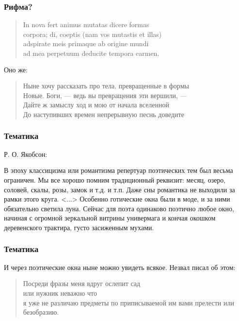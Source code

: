 \documentclass{beamer}
\begin{document}

\begin{frame}
\frametitle{Рифма?}

\begin{verse}
In nova fert animus mutatas dicere formas\\
corpora; di, coeptis (nam vos mutastis et illas)\\
adspirate meis primaque ab origine mundi\\
ad mea perpetuum deducite tempora carmen.
\end{verse}

\begin{center}
Оно же:
\end{center}

\begin{verse}
Ныне хочу рассказать про тела, превращенные в формы\\
Новые. Боги, — ведь  вы превращения эти вершили, —\\
Дайте ж замыслу ход и мою от начала вселенной\\
До наступивших времен непрерывную песнь доведите
\end{verse}

\end{frame}


\begin{frame}
\frametitle{Тематика}

Р. О. Якобсон:

В эпоху классицизма или романтизма репертуар поэтических тем был весьма ограничен. Мы все хорошо помним традиционный реквизит: месяц, озеро, соловей, скалы, розы, замок и т.д. и т.п. Даже сны романтика не выходили за рамки этого круга. <...>  Особенно готические окна были в моде, и за ними обязательно светила луна. Сейчас для поэта одинаково поэтично любое окно, начиная с огромной зеркальной витрины универмага и кончая окошком деревенского трактира, густо засиженным мухами. 

\end{frame}


\begin{frame}
\frametitle{Тематика}

И через поэтические окна ныне можно увидеть всякое. Незвал писал об этом:

\begin{verse}
Посреди фразы меня вдруг ослепит сад\\
или нужник неважно что\\
я уже не различаю предметы по приписываемой им вами прелести или\\
безобразию.
\end{verse}


\end{frame}
\end{document}
